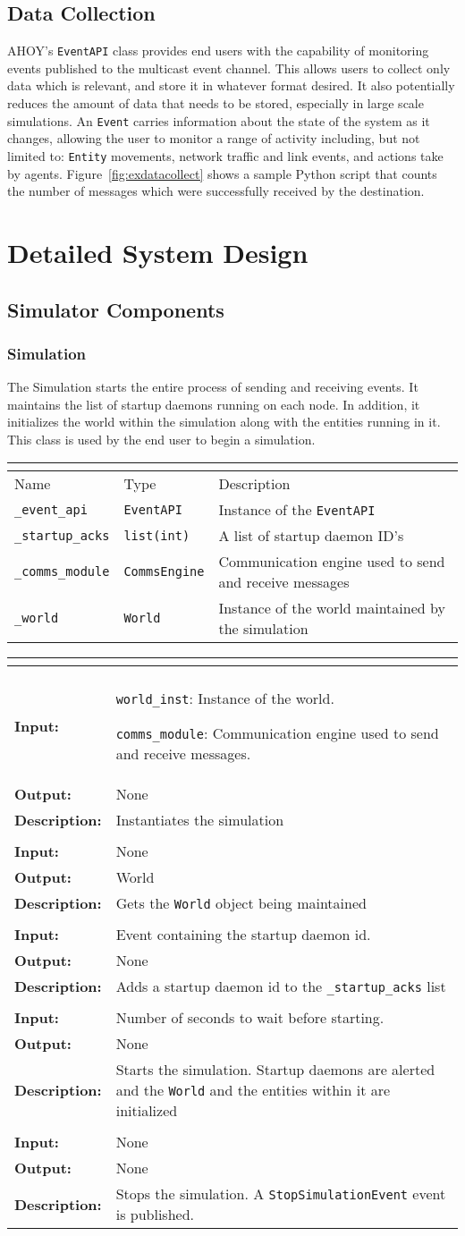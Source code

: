 \documentclass[titlepage]{article}
\renewenvironment{itemize*}
    {\begin{itemize}
        \setlength{\itemsep}{0pt}%
        \setlength{\parskip}{0pt}%
        \setlength{\partopsep}{0pt}%
        \setlength{\topsep}{0pt}}%
    {\end{itemize}}
\newcommand{\operations}[1]{
\begin{center}
    \begin{longtable}{|p{4cm}|p{10cm + 2.0\tabcolsep}|}
    \hline
    \multicolumn{2}{|l|}{\cellcolor[gray]{0.5}{\textbf{Operations}}} \\ \hline
#1
    \end{longtable}
\end{center}
}
\newcommand{\operation}[4]{
    \hline
    \multicolumn{2}{|l|}{\cellcolor[gray]{0.8}{\texttt{#1}}} \\ \hline
    \hspace{7pt}\textbf{Input:} & #2 \\ \hline
    \hspace{7pt}\textbf{Output:} & #3 \\ \hline
    \hspace{7pt}\textbf{Description:} & #4 \\ \hline
}
\newcommand{\attributes}[1]{
    \begin{center}
        \begin{tabular}{|p{3.5cm}|p{3.5cm}|p{7cm}|}
            \multicolumn{3}{|l|}{\cellcolor[gray]{0.5}{\textbf{Attributes}}} \\ \hline
            \rowcolor[gray]{0.8} Name & Type & Description \\ \hline 
            #1
        \end{tabular}
    \end{center}
}
\newcommand{\attribute}[3]{
    \texttt{#1} & \texttt{#2} & #3 \\ \hline
}
\begin{document}
\subsection{Data Collection}
\label{sec:data_collection}
AHOY's \texttt{EventAPI} class provides end users with the capability of monitoring events published to the multicast event channel.  This allows users to collect only data which is relevant, and store it in whatever format desired.  It also potentially reduces the amount of data that needs to be stored, especially in large scale simulations.  An \texttt{Event} carries information about the state of the system as it changes, allowing the user to monitor a range of activity including, but not limited to: \texttt{Entity} movements, network traffic and link events, and actions take by agents.  Figure~\ref{fig:exdatacollect} shows a sample Python script that counts the number of messages which were successfully received by the destination.

\section{Detailed System Design}
\subsection{Simulator Components}
\subsubsection{Simulation}
{The Simulation starts the entire process of sending and receiving events.  It maintains the list of startup daemons running on each node. In addition, it initializes the world within the simulation along with the entities running in it.  This class is used by the end user to begin a simulation.}

\attributes{
    \attribute{\_event\_api}{EventAPI}{Instance of the \texttt{EventAPI}}
    \attribute{\_startup\_acks}{list(int)}{A list of startup daemon ID's}
    \attribute{\_comms\_module}{CommsEngine}{Communication engine used to send and receive messages}
    \attribute{\_world}{World}{Instance of the world maintained by the simulation}
}

\operations{
    \operation{\_\_init\_\_(world\_inst, comms\_module)}
    {
        \begin{itemize*}
            \item \texttt{world\_inst}: Instance of the world. 
            \item \texttt{comms\_module}: Communication engine used to send and receive messages.
        \end{itemize*}
    }{None}{Instantiates the simulation}
    \operation{get\_world()}{None}{World}{Gets the \texttt{World} object being maintained}
    \operation{get\_on\_ack\_startup(event)}{Event containing the startup daemon id.}{None}{Adds a startup daemon id to the \texttt{\_startup\_acks} list}
    \operation{start(wait)}{Number of seconds to wait before starting.}{None}{Starts the simulation. Startup daemons are alerted and the \texttt{World} and the entities within it are initialized}
    \operation{stop()}{None}{None}{Stops the simulation. A \texttt{StopSimulationEvent} event is published.}
}
\end{document}
